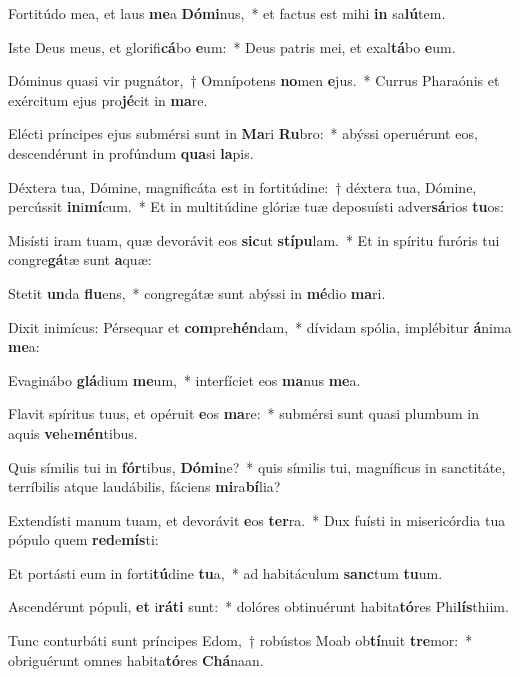 \item Fortitúdo mea, et laus \textbf{me}a \textbf{Dó}\textbf{mi}nus,~* et factus est mihi \textbf{in} sa\textbf{lú}tem.
\item Iste Deus meus, et glorifi\textbf{cá}bo \textbf{e}um:~* Deus patris mei, et exal\textbf{tá}bo \textbf{e}um.
\item Dóminus quasi vir pugnátor,~† Omnípotens \textbf{no}men \textbf{e}jus.~* Currus Pharaónis et exércitum ejus pro\textbf{jé}cit in \textbf{ma}re.
\item Elécti príncipes ejus submérsi sunt in \textbf{Ma}ri \textbf{Ru}bro:~* abýssi operuérunt eos, descendérunt in profúndum \textbf{qua}si \textbf{la}pis.
\item Déxtera tua, Dómine, magnificáta est in fortitúdine:~† déxtera tua, Dómine, percússit \textbf{in}i\textbf{mí}cum.~* Et in multitúdine glóriæ tuæ deposuísti adver\textbf{sá}rios \textbf{tu}os:
\item Misísti iram tuam, quæ devorávit eos \textbf{sic}ut \textbf{stí}\textbf{pu}lam.~* Et in spíritu furóris tui congre\textbf{gá}tæ sunt \textbf{a}quæ:
\item Stetit \textbf{un}da \textbf{flu}ens,~* congregátæ sunt abýssi in \textbf{mé}dio \textbf{ma}ri.
\item Dixit inimícus: Pérsequar et \textbf{com}pre\textbf{hén}dam,~* dívidam spólia, implébitur \textbf{á}nima \textbf{me}a:
\item Evaginábo \textbf{glá}dium \textbf{me}um,~* interfíciet eos \textbf{ma}nus \textbf{me}a.
\item Flavit spíritus tuus, et opéruit \textbf{e}os \textbf{ma}re:~* submérsi sunt quasi plumbum in aquis \textbf{ve}he\textbf{mén}tibus.
\item Quis símilis tui in \textbf{fór}tibus, \textbf{Dó}\textbf{mi}ne?~* quis símilis tui, magníficus in sanctitáte, terríbilis atque laudábilis, fáciens \textbf{mi}ra\textbf{bí}lia?
\item Extendísti manum tuam, et devorávit \textbf{e}os \textbf{ter}ra.~* Dux fuísti in misericórdia tua pópulo quem \textbf{red}e\textbf{mís}ti:
\item Et portásti eum in forti\textbf{tú}dine \textbf{tu}a,~* ad habitáculum \textbf{sanc}tum \textbf{tu}um.
\item Ascendérunt pópuli, \textbf{et} i\textbf{rá}\textbf{ti} sunt:~* dolóres obtinuérunt habita\textbf{tó}res Phi\textbf{lís}thiim.
\item Tunc conturbáti sunt príncipes Edom,~† robústos Moab ob\textbf{tí}nuit \textbf{tre}mor:~* obriguérunt omnes habita\textbf{tó}res \textbf{Chá}naan.
